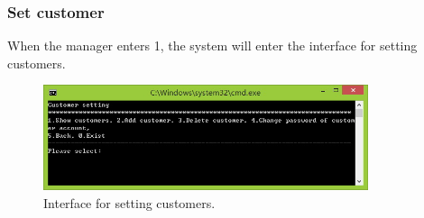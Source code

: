 \documentclass{article}
\begin{document}
\subsubsection{Set customer}
When the manager enters 1, the system will enter the interface for setting customers.
\begin{figure}[H]
    \centering
    \includegraphics[width=0.85\textwidth]{A/02.jpg}
    \caption{Interface for setting customers.}
\end{figure}
\end{document}
